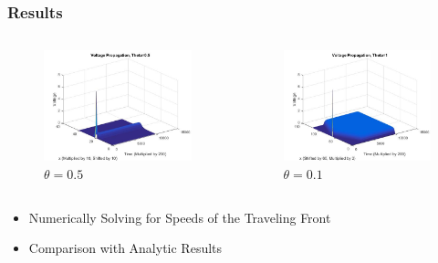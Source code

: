 \documentclass{beamer}
\begin{document}
\begin{frame}
\frametitle{Results}

\begin{columns}


\begin{column}{.5\textwidth}
\begin{figure}[H]
  \includegraphics[width=\linewidth]{thetatwo.jpg}
  \caption{$\theta=0.5$}
  \label{fig:sketch5}
\end{figure}
\end{column}

\begin{column}{.5\textwidth}
\begin{figure}[H]
  \includegraphics[width=\linewidth]{thetathree.jpg}
  \caption{$\theta=0.1$}
  \label{fig:sketch6}
\end{figure}
\end{column}

\end{columns}
\begin{itemize}
	\item{Numerically Solving for Speeds of the Traveling Front}
	\item{Comparison with Analytic Results}
\end{itemize}
\end{frame}
\end{document}
